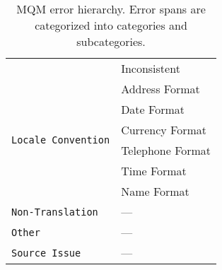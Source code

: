 \begin{table}[ht]
{\begin{tabular}{@{}p{1.2cm}p{2.5cm}@{}}
                                        & Inconsistent \\\cmidrule{1-2}
\multirow{6}{*}{\texttt{Locale Convention}}   & Address Format  \\
                                              & Date Format \\
                                              & Currency Format \\
                                              & Telephone Format \\
                                              & Time Format \\
                                              & Name Format \\\cmidrule{1-2}
\multirow{1}{*}{\texttt{Non-Translation}}   & ---  \\\cmidrule{1-2}
\multirow{1}{*}{\texttt{Other}}   & ---  \\\cmidrule{1-2}
\multirow{1}{*}{\texttt{Source Issue}}   & ---  \\\bottomrule

\end{tabular}%
}
\caption{MQM error hierarchy. Error spans are categorized into categories and subcategories. 
}
\label{tab:error_hierarchy}
\end{table}

